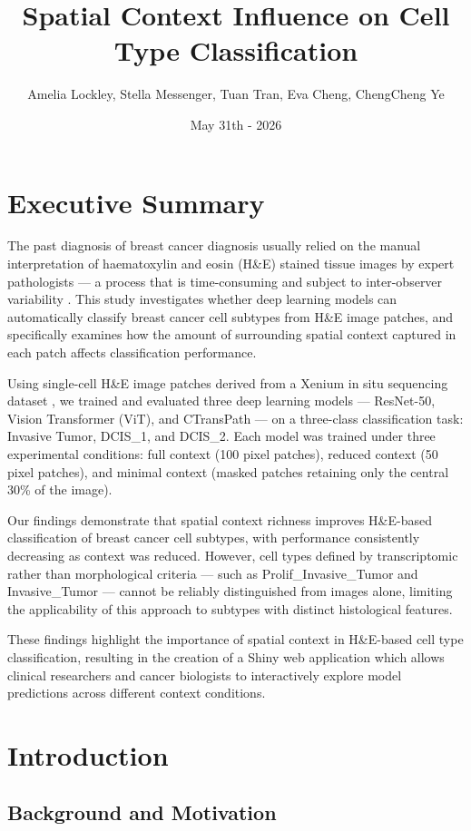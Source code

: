 \documentclass[11pt,a4paper]{article}
\title{Spatial Context Influence on Cell Type Classification}
\author{Amelia Lockley, Stella Messenger, Tuan Tran, Eva Cheng,  ChengCheng Ye}
\date{May 31th - 2026}
\begin{document}
 
\maketitle
\section{Executive Summary}

The past diagnosis of breast cancer diagnosis usually relied on the manual interpretation of haematoxylin and 
eosin (H\&E) stained tissue images by expert pathologists --- a process that is time-consuming and subject to inter-observer variability \citep{elmore2015}. This study investigates whether deep learning models can automatically classify breast cancer cell subtypes from H\&E image patches, and specifically examines how the amount of surrounding spatial context captured in each patch affects classification performance. 

Using single-cell H\&E image patches derived from a Xenium in situ sequencing dataset \citep{janesick2023}, we trained and evaluated three deep learning models 
--- ResNet-50, Vision Transformer (ViT), and CTransPath --- on a three-class classification task: Invasive Tumor, DCIS\_1, and DCIS\_2. Each model was trained under three experimental conditions: full context (100 pixel patches), reduced context 
(50 pixel patches), and minimal context (masked patches retaining only the central 30\% 
of the image).

Our findings demonstrate that spatial context richness improves H\&E-based 
classification of breast cancer cell subtypes, with performance consistently 
decreasing as context was reduced. However, cell types defined by transcriptomic 
rather than morphological criteria --- such as Prolif\_Invasive\_Tumor and 
Invasive\_Tumor --- cannot be reliably distinguished from images alone, limiting 
the applicability of this approach to subtypes with distinct histological features.

These findings highlight the importance of spatial context in H\&E-based cell 
type classification, resulting in the creation of a Shiny web application which allows clinical researchers 
and cancer biologists to interactively explore model predictions across different 
context conditions.

\section{Introduction}
\subsection{Background and Motivation}
\end{document}
